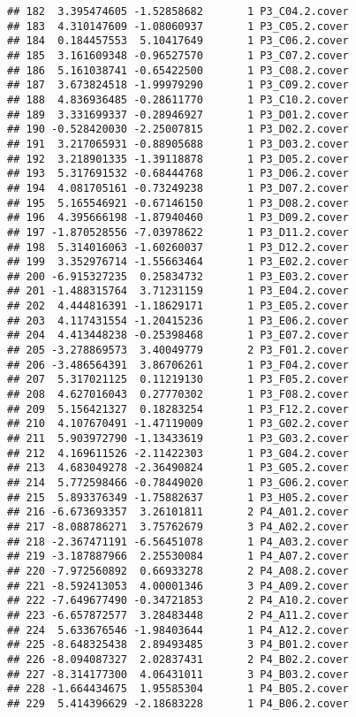 \documentclass[]{article}
\begin{document}
\begin{verbatim}
## 182  3.395474605 -1.52858682       1 P3_C04.2.cover
## 183  4.310147609 -1.08060937       1 P3_C05.2.cover
## 184  0.184457553  5.10417649       1 P3_C06.2.cover
## 185  3.161609348 -0.96527570       1 P3_C07.2.cover
## 186  5.161038741 -0.65422500       1 P3_C08.2.cover
## 187  3.673824518 -1.99979290       1 P3_C09.2.cover
## 188  4.836936485 -0.28611770       1 P3_C10.2.cover
## 189  3.331699337 -0.28946927       1 P3_D01.2.cover
## 190 -0.528420030 -2.25007815       1 P3_D02.2.cover
## 191  3.217065931 -0.88905688       1 P3_D03.2.cover
## 192  3.218901335 -1.39118878       1 P3_D05.2.cover
## 193  5.317691532 -0.68444768       1 P3_D06.2.cover
## 194  4.081705161 -0.73249238       1 P3_D07.2.cover
## 195  5.165546921 -0.67146150       1 P3_D08.2.cover
## 196  4.395666198 -1.87940460       1 P3_D09.2.cover
## 197 -1.870528556 -7.03978622       1 P3_D11.2.cover
## 198  5.314016063 -1.60260037       1 P3_D12.2.cover
## 199  3.352976714 -1.55663464       1 P3_E02.2.cover
## 200 -6.915327235  0.25834732       1 P3_E03.2.cover
## 201 -1.488315764  3.71231159       1 P3_E04.2.cover
## 202  4.444816391 -1.18629171       1 P3_E05.2.cover
## 203  4.117431554 -1.20415236       1 P3_E06.2.cover
## 204  4.413448238 -0.25398468       1 P3_E07.2.cover
## 205 -3.278869573  3.40049779       2 P3_F01.2.cover
## 206 -3.486564391  3.86706261       1 P3_F04.2.cover
## 207  5.317021125  0.11219130       1 P3_F05.2.cover
## 208  4.627016043  0.27770302       1 P3_F08.2.cover
## 209  5.156421327  0.18283254       1 P3_F12.2.cover
## 210  4.107670491 -1.47119009       1 P3_G02.2.cover
## 211  5.903972790 -1.13433619       1 P3_G03.2.cover
## 212  4.169611526 -2.11422303       1 P3_G04.2.cover
## 213  4.683049278 -2.36490824       1 P3_G05.2.cover
## 214  5.772598466 -0.78449020       1 P3_G06.2.cover
## 215  5.893376349 -1.75882637       1 P3_H05.2.cover
## 216 -6.673693357  3.26101811       2 P4_A01.2.cover
## 217 -8.088786271  3.75762679       3 P4_A02.2.cover
## 218 -2.367471191 -6.56451078       1 P4_A03.2.cover
## 219 -3.187887966  2.25530084       1 P4_A07.2.cover
## 220 -7.972560892  0.66933278       2 P4_A08.2.cover
## 221 -8.592413053  4.00001346       3 P4_A09.2.cover
## 222 -7.649677490 -0.34721853       2 P4_A10.2.cover
## 223 -6.657872577  3.28483448       2 P4_A11.2.cover
## 224  5.633676546 -1.98403644       1 P4_A12.2.cover
## 225 -8.648325438  2.89493485       3 P4_B01.2.cover
## 226 -8.094087327  2.02837431       2 P4_B02.2.cover
## 227 -8.314177300  4.06431011       3 P4_B03.2.cover
## 228 -1.664434675  1.95585304       1 P4_B05.2.cover
## 229  5.414396629 -2.18683228       1 P4_B06.2.cover

\end{verbatim}
\end{document}
